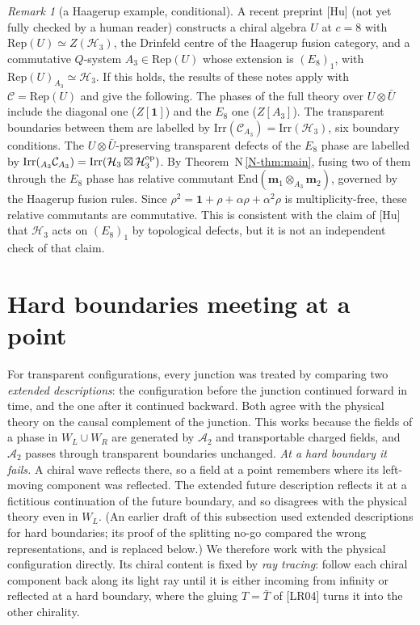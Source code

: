 \documentclass[11pt]{article}
\theoremstyle{definition}
\theoremstyle{remark}
\newtheorem{remark}[theorem]{Remark}
\newcommand{\cA}{\mathcal A}
\newcommand{\nref}[1]{N\,\ref{N-#1}}
\begin{document}
\begin{remark}[a Haagerup example, conditional]\label{rem:haagerup}
A recent preprint [Hu] (not yet fully checked by a human reader) constructs a chiral algebra $U$ at $c=8$ with $\mathrm{Rep}(U)\simeq Z(\mathcal H_3)$, the Drinfeld centre of the Haagerup fusion category, and a commutative $Q$-system $A_3\in\mathrm{Rep}(U)$ whose extension is $(E_8)_1$, with $\mathrm{Rep}(U)_{A_3}\simeq\mathcal H_3$. If this holds, the results of these notes apply with $\mathcal C=\mathrm{Rep}(U)$ and give the following. The phases of the full theory over $U\otimes\bar U$ include the diagonal one ($Z[\mathbf 1]$) and the $E_8$ one ($Z[A_3]$). The transparent boundaries between them are labelled by $\mathrm{Irr}(\mathcal C_{A_3})=\mathrm{Irr}(\mathcal H_3)$, six boundary conditions. The $U\otimes\bar U$-preserving transparent defects of the $E_8$ phase are labelled by $\mathrm{Irr}({}_{A_3}\mathcal C_{A_3})=\mathrm{Irr}(\mathcal H_3\boxtimes\mathcal H_3^{\rm op})$. By Theorem~\nref{thm:main}, fusing two of them through the $E_8$ phase has relative commutant $\mathrm{End}(\mathbf m_1\otimes_{A_3}\mathbf m_2)$, governed by the Haagerup fusion rules. Since $\rho^2=\mathbf 1+\rho+\alpha\rho+\alpha^2\rho$ is multiplicity-free, these relative commutants are commutative. This is consistent with the claim of [Hu] that $\mathcal H_3$ acts on $(E_8)_1$ by topological defects, but it is not an independent check of that claim.
\end{remark}

\section{Hard boundaries meeting at a point}\label{sec:hardmeet}
For transparent configurations, every junction was treated by comparing two \emph{extended descriptions}: the configuration before the junction continued forward in time, and the one after it continued backward. Both agree with the physical theory on the causal complement of the junction. This works because the fields of a phase in $W_L\cup W_R$ are generated by $\cA_2$ and transportable charged fields, and $\cA_2$ passes through transparent boundaries unchanged. \emph{At a hard boundary it fails.} A chiral wave reflects there, so a field at a point remembers where its left-moving component was reflected. The extended future description reflects it at a fictitious continuation of the future boundary, and so disagrees with the physical theory even in $W_L$. (An earlier draft of this subsection used extended descriptions for hard boundaries; its proof of the splitting no-go compared the wrong representations, and is replaced below.) We therefore work with the physical configuration directly. Its chiral content is fixed by \emph{ray tracing}: follow each chiral component back along its light ray until it is either incoming from infinity or reflected at a hard boundary, where the gluing $T=\bar T$ of [LR04] turns it into the other chirality.
\end{document}
